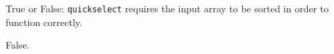 \begin{prob}
    True or False: \texttt{quickselect} requires the input array to be sorted in order
    to function correctly.

    \tF{}

    \begin{soln}
        False.
    \end{soln}
\end{prob}
